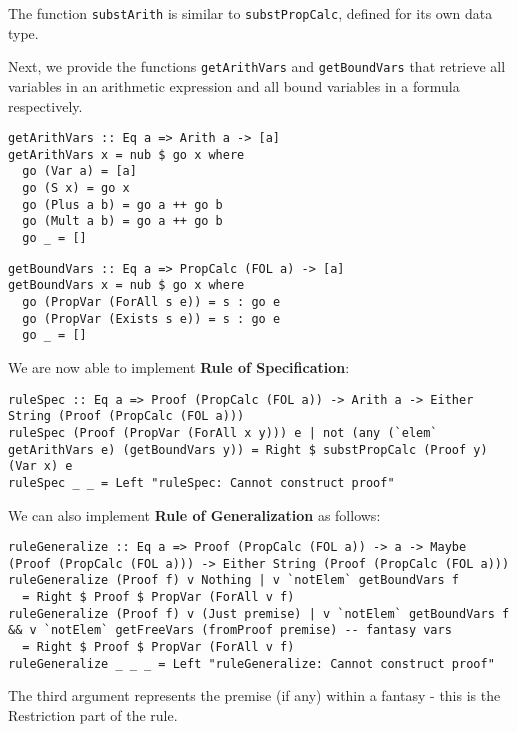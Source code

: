 \documentclass{article}
\begin{document}
The function \texttt{substArith} is similar to \texttt{substPropCalc}, defined for its own data type.

Next, we provide the functions \texttt{getArithVars} and \texttt{getBoundVars} that retrieve all variables in an arithmetic expression and all bound variables in a formula respectively.

\begin{minipage}{0.49\textwidth}
\begin{lstlisting}
getArithVars :: Eq a => Arith a -> [a]
getArithVars x = nub $ go x where
  go (Var a) = [a]
  go (S x) = go x
  go (Plus a b) = go a ++ go b
  go (Mult a b) = go a ++ go b
  go _ = []
\end{lstlisting}
\end{minipage}
\begin{minipage}{0.49\textwidth}
\begin{lstlisting}
getBoundVars :: Eq a => PropCalc (FOL a) -> [a]
getBoundVars x = nub $ go x where
  go (PropVar (ForAll s e)) = s : go e
  go (PropVar (Exists s e)) = s : go e
  go _ = []
\end{lstlisting}
\end{minipage}

We are now able to implement \textbf{Rule of Specification}:

\begin{lstlisting}
ruleSpec :: Eq a => Proof (PropCalc (FOL a)) -> Arith a -> Either String (Proof (PropCalc (FOL a)))
ruleSpec (Proof (PropVar (ForAll x y))) e | not (any (`elem` getArithVars e) (getBoundVars y)) = Right $ substPropCalc (Proof y) (Var x) e
ruleSpec _ _ = Left "ruleSpec: Cannot construct proof"
\end{lstlisting}

We can also implement \textbf{Rule of Generalization} as follows:

\begin{lstlisting}
ruleGeneralize :: Eq a => Proof (PropCalc (FOL a)) -> a -> Maybe (Proof (PropCalc (FOL a))) -> Either String (Proof (PropCalc (FOL a)))
ruleGeneralize (Proof f) v Nothing | v `notElem` getBoundVars f
  = Right $ Proof $ PropVar (ForAll v f)
ruleGeneralize (Proof f) v (Just premise) | v `notElem` getBoundVars f && v `notElem` getFreeVars (fromProof premise) -- fantasy vars
  = Right $ Proof $ PropVar (ForAll v f)
ruleGeneralize _ _ _ = Left "ruleGeneralize: Cannot construct proof"
\end{lstlisting}

The third argument represents the premise (if any) within a fantasy - this is the Restriction part of the rule.
\end{document}
